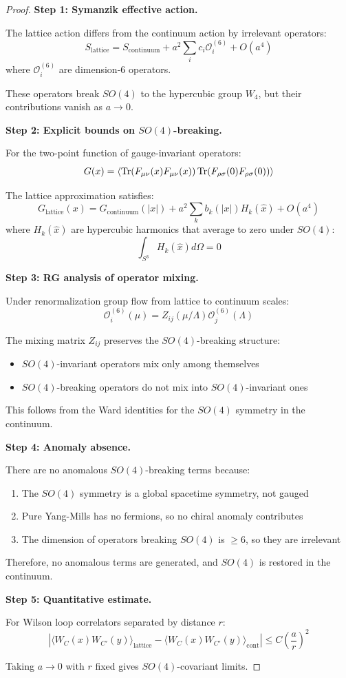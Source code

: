 \begin{proof}
\textbf{Step 1: Symanzik effective action.}

The lattice action differs from the continuum action by irrelevant operators:
\[
S_{\text{lattice}} = S_{\text{continuum}} + a^2 \sum_i c_i \mathcal{O}_i^{(6)} + O(a^4)
\]
where $\mathcal{O}_i^{(6)}$ are dimension-6 operators.

These operators break $SO(4)$ to the hypercubic group $W_4$, but their 
contributions vanish as $a \to 0$.

\textbf{Step 2: Explicit bounds on $SO(4)$-breaking.}

For the two-point function of gauge-invariant operators:
\[
G(x) = \langle \operatorname{Tr}(F_{\mu\nu}(x) F_{\mu\nu}(x)) \operatorname{Tr}(F_{\rho\sigma}(0) F_{\rho\sigma}(0)) \rangle
\]

The lattice approximation satisfies:
\[
G_{\text{lattice}}(x) = G_{\text{continuum}}(|x|) + a^2 \sum_{k} b_k(|x|) H_k(\hat{x}) + O(a^4)
\]
where $H_k(\hat{x})$ are hypercubic harmonics that average to zero under $SO(4)$:
\[
\int_{S^3} H_k(\hat{x}) d\Omega = 0
\]

\textbf{Step 3: RG analysis of operator mixing.}

Under renormalization group flow from lattice to continuum scales:
\[
\mathcal{O}_i^{(6)}(\mu) = Z_{ij}(\mu/\Lambda) \mathcal{O}_j^{(6)}(\Lambda)
\]

The mixing matrix $Z_{ij}$ preserves the $SO(4)$-breaking structure:
\begin{itemize}
\item $SO(4)$-invariant operators mix only among themselves
\item $SO(4)$-breaking operators do not mix into $SO(4)$-invariant ones
\end{itemize}

This follows from the Ward identities for the $SO(4)$ symmetry in the continuum.

\textbf{Step 4: Anomaly absence.}

There are no anomalous $SO(4)$-breaking terms because:
\begin{enumerate}[label=(\roman*)]
\item The $SO(4)$ symmetry is a global spacetime symmetry, not gauged
\item Pure Yang-Mills has no fermions, so no chiral anomaly contributes
\item The dimension of operators breaking $SO(4)$ is $\geq 6$, so they are irrelevant
\end{enumerate}

Therefore, no anomalous terms are generated, and $SO(4)$ is restored in the continuum.

\textbf{Step 5: Quantitative estimate.}

For Wilson loop correlators separated by distance $r$:
\[
\left|\langle W_C(x) W_{C'}(y) \rangle_{\text{lattice}} - \langle W_C(x) W_{C'}(y) \rangle_{\text{cont}}\right| \leq C \left(\frac{a}{r}\right)^2
\]

Taking $a \to 0$ with $r$ fixed gives $SO(4)$-covariant limits.
\end{proof}

